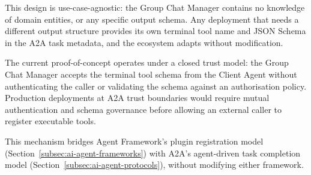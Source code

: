 This design is use-case-agnostic: the Group Chat Manager contains no knowledge of
    domain entities, or any specific output schema.
Any deployment that needs a different output structure provides its own
    terminal tool name and JSON Schema in the A2A task metadata,
    and the ecosystem adapts without modification.

The current proof-of-concept operates under a closed trust model:
    the Group Chat Manager accepts the terminal tool schema from the Client Agent
    without authenticating the caller or validating the schema against
    an authorisation policy.
Production deployments at A2A trust boundaries would require
    mutual authentication and schema governance
    before allowing an external caller to register executable tools.

This mechanism bridges Agent Framework's plugin registration model
    (Section~\ref{subsec:ai-agent-frameworks}) with A2A's agent-driven task completion model
    (Section~\ref{subsec:ai-agent-protocols}), without modifying either framework.
